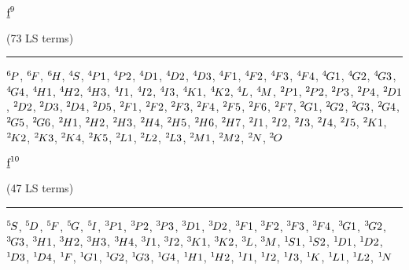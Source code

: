 \begin{mdframed}
\begin{center}
$\underbar{$\text{f}$}^{9}$

(73 LS terms)
\vspace{0.25cm}
\hrule
\vspace{0.25cm}

${}^{6}{\kern-0.1em}{P}$, ${}^{6}{\kern-0.1em}{F}$, ${}^{6}{\kern-0.1em}{H}$, ${}^{4}{\kern-0.1em}{S}$, ${}^{4}{\kern-0.1em}{P1}$, ${}^{4}{\kern-0.1em}{P2}$, ${}^{4}{\kern-0.1em}{D1}$, ${}^{4}{\kern-0.1em}{D2}$, ${}^{4}{\kern-0.1em}{D3}$, ${}^{4}{\kern-0.1em}{F1}$, ${}^{4}{\kern-0.1em}{F2}$, ${}^{4}{\kern-0.1em}{F3}$, ${}^{4}{\kern-0.1em}{F4}$, ${}^{4}{\kern-0.1em}{G1}$, ${}^{4}{\kern-0.1em}{G2}$, ${}^{4}{\kern-0.1em}{G3}$, ${}^{4}{\kern-0.1em}{G4}$, ${}^{4}{\kern-0.1em}{H1}$, ${}^{4}{\kern-0.1em}{H2}$, ${}^{4}{\kern-0.1em}{H3}$, ${}^{4}{\kern-0.1em}{I1}$, ${}^{4}{\kern-0.1em}{I2}$, ${}^{4}{\kern-0.1em}{I3}$, ${}^{4}{\kern-0.1em}{K1}$, ${}^{4}{\kern-0.1em}{K2}$, ${}^{4}{\kern-0.1em}{L}$, ${}^{4}{\kern-0.1em}{M}$, ${}^{2}{\kern-0.1em}{P1}$, ${}^{2}{\kern-0.1em}{P2}$, ${}^{2}{\kern-0.1em}{P3}$, ${}^{2}{\kern-0.1em}{P4}$, ${}^{2}{\kern-0.1em}{D1}$, ${}^{2}{\kern-0.1em}{D2}$, ${}^{2}{\kern-0.1em}{D3}$, ${}^{2}{\kern-0.1em}{D4}$, ${}^{2}{\kern-0.1em}{D5}$, ${}^{2}{\kern-0.1em}{F1}$, ${}^{2}{\kern-0.1em}{F2}$, ${}^{2}{\kern-0.1em}{F3}$, ${}^{2}{\kern-0.1em}{F4}$, ${}^{2}{\kern-0.1em}{F5}$, ${}^{2}{\kern-0.1em}{F6}$, ${}^{2}{\kern-0.1em}{F7}$, ${}^{2}{\kern-0.1em}{G1}$, ${}^{2}{\kern-0.1em}{G2}$, ${}^{2}{\kern-0.1em}{G3}$, ${}^{2}{\kern-0.1em}{G4}$, ${}^{2}{\kern-0.1em}{G5}$, ${}^{2}{\kern-0.1em}{G6}$, ${}^{2}{\kern-0.1em}{H1}$, ${}^{2}{\kern-0.1em}{H2}$, ${}^{2}{\kern-0.1em}{H3}$, ${}^{2}{\kern-0.1em}{H4}$, ${}^{2}{\kern-0.1em}{H5}$, ${}^{2}{\kern-0.1em}{H6}$, ${}^{2}{\kern-0.1em}{H7}$, ${}^{2}{\kern-0.1em}{I1}$, ${}^{2}{\kern-0.1em}{I2}$, ${}^{2}{\kern-0.1em}{I3}$, ${}^{2}{\kern-0.1em}{I4}$, ${}^{2}{\kern-0.1em}{I5}$, ${}^{2}{\kern-0.1em}{K1}$, ${}^{2}{\kern-0.1em}{K2}$, ${}^{2}{\kern-0.1em}{K3}$, ${}^{2}{\kern-0.1em}{K4}$, ${}^{2}{\kern-0.1em}{K5}$, ${}^{2}{\kern-0.1em}{L1}$, ${}^{2}{\kern-0.1em}{L2}$, ${}^{2}{\kern-0.1em}{L3}$, ${}^{2}{\kern-0.1em}{M1}$, ${}^{2}{\kern-0.1em}{M2}$, ${}^{2}{\kern-0.1em}{N}$, ${}^{2}{\kern-0.1em}{O}$
\end{center}
\end{mdframed}

\begin{mdframed}
\begin{center}
$\underbar{$\text{f}$}^{10}$

(47 LS terms)
\vspace{0.25cm}
\hrule
\vspace{0.25cm}

${}^{5}{\kern-0.1em}{S}$, ${}^{5}{\kern-0.1em}{D}$, ${}^{5}{\kern-0.1em}{F}$, ${}^{5}{\kern-0.1em}{G}$, ${}^{5}{\kern-0.1em}{I}$, ${}^{3}{\kern-0.1em}{P1}$, ${}^{3}{\kern-0.1em}{P2}$, ${}^{3}{\kern-0.1em}{P3}$, ${}^{3}{\kern-0.1em}{D1}$, ${}^{3}{\kern-0.1em}{D2}$, ${}^{3}{\kern-0.1em}{F1}$, ${}^{3}{\kern-0.1em}{F2}$, ${}^{3}{\kern-0.1em}{F3}$, ${}^{3}{\kern-0.1em}{F4}$, ${}^{3}{\kern-0.1em}{G1}$, ${}^{3}{\kern-0.1em}{G2}$, ${}^{3}{\kern-0.1em}{G3}$, ${}^{3}{\kern-0.1em}{H1}$, ${}^{3}{\kern-0.1em}{H2}$, ${}^{3}{\kern-0.1em}{H3}$, ${}^{3}{\kern-0.1em}{H4}$, ${}^{3}{\kern-0.1em}{I1}$, ${}^{3}{\kern-0.1em}{I2}$, ${}^{3}{\kern-0.1em}{K1}$, ${}^{3}{\kern-0.1em}{K2}$, ${}^{3}{\kern-0.1em}{L}$, ${}^{3}{\kern-0.1em}{M}$, ${}^{1}{\kern-0.1em}{S1}$, ${}^{1}{\kern-0.1em}{S2}$, ${}^{1}{\kern-0.1em}{D1}$, ${}^{1}{\kern-0.1em}{D2}$, ${}^{1}{\kern-0.1em}{D3}$, ${}^{1}{\kern-0.1em}{D4}$, ${}^{1}{\kern-0.1em}{F}$, ${}^{1}{\kern-0.1em}{G1}$, ${}^{1}{\kern-0.1em}{G2}$, ${}^{1}{\kern-0.1em}{G3}$, ${}^{1}{\kern-0.1em}{G4}$, ${}^{1}{\kern-0.1em}{H1}$, ${}^{1}{\kern-0.1em}{H2}$, ${}^{1}{\kern-0.1em}{I1}$, ${}^{1}{\kern-0.1em}{I2}$, ${}^{1}{\kern-0.1em}{I3}$, ${}^{1}{\kern-0.1em}{K}$, ${}^{1}{\kern-0.1em}{L1}$, ${}^{1}{\kern-0.1em}{L2}$, ${}^{1}{\kern-0.1em}{N}$
\end{center}
\end{mdframed}

